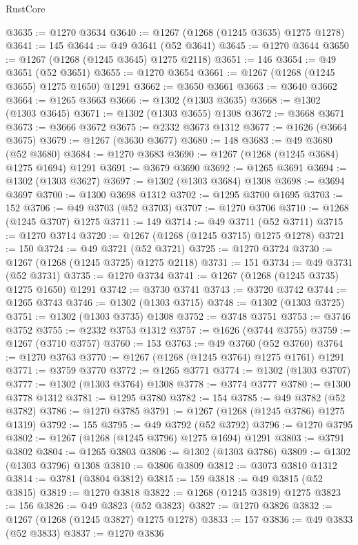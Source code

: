 \begin{lexlean}{RustCore}
\begin{coremodule}
@3635 := @1270 @3634
@3640 := @1267 (@1268 (@1245 @3635) @1275 @1278)
@3641 := 145
@3644 := @49 @3641 (@52 @3641)
@3645 := @1270 @3644
@3650 := @1267 (@1268 (@1245 @3645) @1275 @2118)
@3651 := 146
@3654 := @49 @3651 (@52 @3651)
@3655 := @1270 @3654
@3661 := @1267 (@1268 (@1245 @3655) @1275 @1650) @1291
@3662 := @3650 @3661
@3663 := @3640 @3662
@3664 := @1265 @3663
@3666 := @1302 (@1303 @3635)
@3668 := @1302 (@1303 @3645)
@3671 := @1302 (@1303 @3655) @1308
@3672 := @3668 @3671
@3673 := @3666 @3672
@3675 := @2332 @3673 @1312
@3677 := @1626 (@3664 @3675)
@3679 := @1267 (@3630 @3677)
@3680 := 148
@3683 := @49 @3680 (@52 @3680)
@3684 := @1270 @3683
@3690 := @1267 (@1268 (@1245 @3684) @1275 @1694) @1291
@3691 := @3679 @3690
@3692 := @1265 @3691
@3694 := @1302 (@1303 @3627)
@3697 := @1302 (@1303 @3684) @1308
@3698 := @3694 @3697
@3700 := @1300 @3698 @1312
@3702 := @1295 @3700 @1695
@3703 := 152
@3706 := @49 @3703 (@52 @3703)
@3707 := @1270 @3706
@3710 := @1268 (@1245 @3707) @1275
@3711 := 149
@3714 := @49 @3711 (@52 @3711)
@3715 := @1270 @3714
@3720 := @1267 (@1268 (@1245 @3715) @1275 @1278)
@3721 := 150
@3724 := @49 @3721 (@52 @3721)
@3725 := @1270 @3724
@3730 := @1267 (@1268 (@1245 @3725) @1275 @2118)
@3731 := 151
@3734 := @49 @3731 (@52 @3731)
@3735 := @1270 @3734
@3741 := @1267 (@1268 (@1245 @3735) @1275 @1650) @1291
@3742 := @3730 @3741
@3743 := @3720 @3742
@3744 := @1265 @3743
@3746 := @1302 (@1303 @3715)
@3748 := @1302 (@1303 @3725)
@3751 := @1302 (@1303 @3735) @1308
@3752 := @3748 @3751
@3753 := @3746 @3752
@3755 := @2332 @3753 @1312
@3757 := @1626 (@3744 @3755)
@3759 := @1267 (@3710 @3757)
@3760 := 153
@3763 := @49 @3760 (@52 @3760)
@3764 := @1270 @3763
@3770 := @1267 (@1268 (@1245 @3764) @1275 @1761) @1291
@3771 := @3759 @3770
@3772 := @1265 @3771
@3774 := @1302 (@1303 @3707)
@3777 := @1302 (@1303 @3764) @1308
@3778 := @3774 @3777
@3780 := @1300 @3778 @1312
@3781 := @1295 @3780
@3782 := 154
@3785 := @49 @3782 (@52 @3782)
@3786 := @1270 @3785
@3791 := @1267 (@1268 (@1245 @3786) @1275 @1319)
@3792 := 155
@3795 := @49 @3792 (@52 @3792)
@3796 := @1270 @3795
@3802 := @1267 (@1268 (@1245 @3796) @1275 @1694) @1291
@3803 := @3791 @3802
@3804 := @1265 @3803
@3806 := @1302 (@1303 @3786)
@3809 := @1302 (@1303 @3796) @1308
@3810 := @3806 @3809
@3812 := @3073 @3810 @1312
@3814 := @3781 (@3804 @3812)
@3815 := 159
@3818 := @49 @3815 (@52 @3815)
@3819 := @1270 @3818
@3822 := @1268 (@1245 @3819) @1275
@3823 := 156
@3826 := @49 @3823 (@52 @3823)
@3827 := @1270 @3826
@3832 := @1267 (@1268 (@1245 @3827) @1275 @1278)
@3833 := 157
@3836 := @49 @3833 (@52 @3833)
@3837 := @1270 @3836

\end{coremodule}
\end{lexlean}
